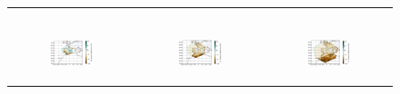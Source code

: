\begin{figure}[htbp]
\begin{tabular}{ccc}
\begin{subfigure}[b]{0.33\textwidth}
        \end{subfigure} \\
        
        \begin{subfigure}[b]{0.33\textwidth}
            \caption{}
            \includegraphics[width=\textwidth]{images/chap4/domain_size/rel_diff_map_evap_era_LAM_1000km_NBP40.png}
        \end{subfigure} &
        \begin{subfigure}[b]{0.33\textwidth}
            \caption{}
            \includegraphics[width=\textwidth]{images/chap4/domain_size/rel_diff_map_evap_era_LAM_1500km_NBP60.png}
        \end{subfigure} &
        \begin{subfigure}[b]{0.33\textwidth}
            \caption{}
            \includegraphics[width=\textwidth]{images/chap4/domain_size/rel_diff_map_evap_era_LAM_2000km_NBP80.png}

\end{subfigure}
\end{tabular}
\end{figure}
